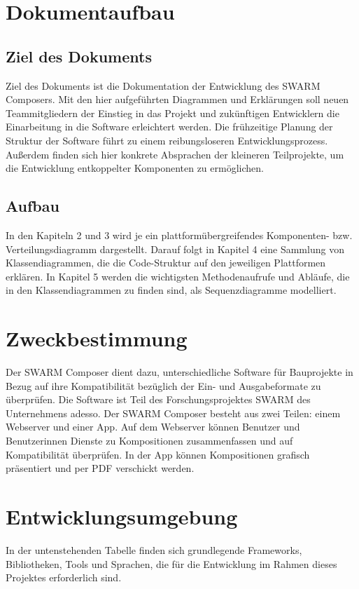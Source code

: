 \section{Dokumentaufbau}\label{sec:dokumentaufbau}
\subsection{Ziel des Dokuments}
Ziel des Dokuments ist die Dokumentation der Entwicklung des SWARM Composers. 
Mit den hier aufgeführten Diagrammen und Erklärungen soll neuen Teammitgliedern der Einstieg in das Projekt und zukünftigen Entwicklern die Einarbeitung in die Software erleichtert werden.
Die frühzeitige Planung der Struktur der Software führt zu einem reibungsloseren Entwicklungsprozess. 
Außerdem finden sich hier konkrete Absprachen der kleineren Teilprojekte, um die Entwicklung entkoppelter Komponenten zu ermöglichen.
\subsection{Aufbau}
In den Kapiteln 2 und 3 wird je ein plattformübergreifendes Komponenten- bzw. Verteilungsdiagramm dargestellt. 
Darauf folgt in Kapitel 4 eine Sammlung von Klassendiagrammen, die die Code-Struktur auf den jeweiligen Plattformen erklären.
In Kapitel 5 werden die wichtigsten Methodenaufrufe und Abläufe, die in den Klassendiagrammen zu finden sind, als Sequenzdiagramme modelliert.


\section{Zweckbestimmung}\label{sec:zweckbestimmung}
Der SWARM Composer dient dazu, unterschiedliche Software für Bauprojekte in Bezug auf ihre Kompatibilität bezüglich der Ein- und Ausgabeformate zu überprüfen. 
Die Software ist Teil des Forschungsprojektes SWARM des Unternehmens adesso. 
Der SWARM Composer besteht aus zwei Teilen: einem Webserver und einer App. 
Auf dem Webserver können Benutzer und Benutzerinnen Dienste zu Kompositionen zusammenfassen und auf Kompatibilität überprüfen.
In der App können Kompositionen grafisch präsentiert und per PDF verschickt werden.
\section{Entwicklungsumgebung}\label{sec:entwicklungsumgebung}
In der untenstehenden Tabelle finden sich grundlegende Frameworks, Bibliotheken, Tools und Sprachen, die für die Entwicklung im Rahmen dieses Projektes erforderlich sind.


